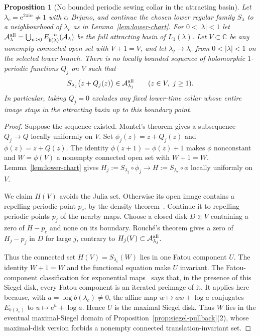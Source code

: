 \documentclass[11pt]{amsart}
\newtheorem{proposition}[theorem]{Proposition}
\theoremstyle{definition}
\newcommand{\eee}{\mathrm{e}}
\newcommand{\ii}{\mathrm{i}}
\begin{document}
\begin{proposition}[No bounded periodic sewing collar in the attracting basin]
\label{prop:no-basin-collar}
Let $\lambda_c=\eee^{2\pi\ii\alpha}\ne1$ with $\alpha$ Brjuno, and
continue the chosen lower regular family $S_\lambda$ to a
neighbourhood of $\lambda_c$ as in Lemma~\ref{lem:lower-chart}.
For $0<|\lambda|<1$ let
$\mathcal A_\lambda^{\rm all}
 =\bigcup_{n\ge0}E_{b(\lambda)}^{-n}(\mathcal A_\lambda)$
be the full attracting basin of $L_1(\lambda)$.
Let $V\subset\mathbb C$ be any nonempty connected open set with
$V+1=V$, and let $\lambda_j\to\lambda_c$ from $0<|\lambda|<1$
on the selected lower branch.  There is no locally bounded sequence
of holomorphic $1$-periodic functions $Q_j$ on $V$ such that
\[
 S_{\lambda_j}\bigl(z+Q_j(z)\bigr)
       \in\mathcal A_{\lambda_j}^{\rm all}
 \qquad(z\in V,\ j\ge1).
\]
In particular, taking $Q_j=0$ excludes any fixed lower-time collar
whose entire image stays in the attracting basin up to this boundary
point.
\end{proposition}

\begin{proof}
Suppose the sequence existed.  Montel's theorem gives a subsequence
$Q_j\to Q$ locally uniformly on $V$.  Set
$\phi_j(z)=z+Q_j(z)$ and $\phi(z)=z+Q(z)$.
The identity $\phi(z+1)=\phi(z)+1$ makes $\phi$ nonconstant and
$W=\phi(V)$ a nonempty connected open set with $W+1=W$.
Lemma~\ref{lem:lower-chart} gives
$H_j:=S_{\lambda_j}\circ\phi_j\to
 H:=S_{\lambda_c}\circ\phi$ locally uniformly on $V$.

We claim $H(V)$ avoids the Julia set.  Otherwise its open image
contains a repelling periodic point $p_c$, by the density
theorem~\cite[Thm.~4]{Bergweiler1993}.  Continue it to repelling periodic
points $p_j$ of the nearby maps.  Choose a closed disk
$\overline D\Subset V$ containing a zero of $H-p_c$ and none on its
boundary.  Rouch\'e's theorem gives a zero of $H_j-p_j$ in $D$ for
large $j$, contrary to
$H_j(V)\subset\mathcal A_{\lambda_j}^{\rm all}$.

Thus the connected set $H(V)=S_{\lambda_c}(W)$ lies in one Fatou
component $U$.  The identity $W+1=W$ and the functional equation
make $U$ invariant.  The Fatou-component classification for
exponential maps~\cite[\S1, Remarks on notation]{Rempe2006Topological}
says that, in the presence of this Siegel disk, every Fatou component
is an iterated preimage of it.  It applies here because, with
$a=\log b(\lambda_c)\ne0$, the affine map
$w\mapsto aw+\log a$ conjugates $E_{b(\lambda_c)}$ to
$u\mapsto\eee^u+\log a$.  Hence $U$ is the maximal Siegel disk.
Thus $W$ lies in the eventual maximal-Siegel domain of
Proposition~\ref{prop:siegel-pullback}(2), whose maximal-disk version
forbids a nonempty connected translation-invariant set.
\end{proof}
\end{document}
